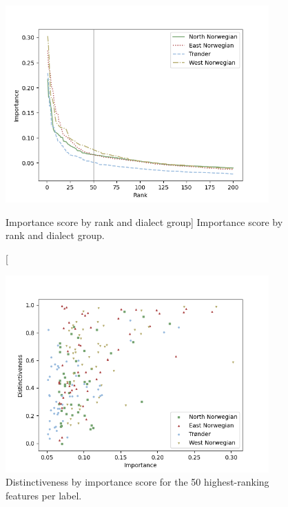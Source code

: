 \begin{figure}[htbp]
    \centering
    \includegraphics[width=0.9\textwidth]{figures/3-dialects/importance-rank-all-mean-unscaled-50.png}
    \caption
    [Importance score by rank and dialect group]
    {Importance score by rank and dialect group.}
    \label{fig:imp-rank}
\end{figure}
\begin{figure}[htbp]
    \centering
    \includegraphics[width=0.9\textwidth]{figures/3-dialects/importance-dist-all-mean-unscaled-50.png}
    \caption[Distinctiveness by LIME score for the 50 highest-ranking features per dialect group]
    {Distinctiveness by importance score for the 50 highest-ranking features per label.}
    \label{fig:imp-dist50}
\end{figure}

